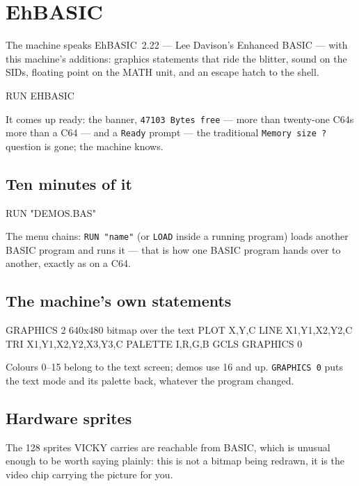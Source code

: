 \chapter{EhBASIC}\label{cha:basic}

The machine speaks EhBASIC~2.22 --- Lee Davison's Enhanced BASIC --- with
this machine's additions: graphics statements that ride the blitter, sound
on the SIDs, floating point on the MATH unit, and an escape hatch to the
shell.

\begin{type}
RUN EHBASIC
\end{type}

It comes up ready: the banner, \texttt{47103 Bytes free} --- more than
twenty-one C64s more than a C64 --- and a
\verb|Ready| prompt --- the traditional \texttt{Memory size ?} question is
gone; the machine knows.

\section{Ten minutes of it}
\begin{type}
RUN "DEMOS.BAS"
\end{type}


The menu chains: \verb|RUN "name"| (or \verb|LOAD| inside a running
program) loads another BASIC program and runs it --- that is how one BASIC
program hands over to another, exactly as on a C64.

\section{The machine's own statements}
\begin{type}
GRAPHICS 2          640x480 bitmap over the text
PLOT X,Y,C          LINE X1,Y1,X2,Y2,C
TRI X1,Y1,X2,Y2,X3,Y3,C
PALETTE I,R,G,B     GCLS            GRAPHICS 0
\end{type}

Colours 0--15 belong to the text screen; demos use 16 and up. \verb|GRAPHICS 0|
puts the text mode and its palette back, whatever the program changed.

\section{Hardware sprites}
The 128 sprites VICKY carries are reachable from BASIC, which is unusual
enough to be worth saying plainly: this is not a bitmap being redrawn, it
is the video chip carrying the picture for you.

